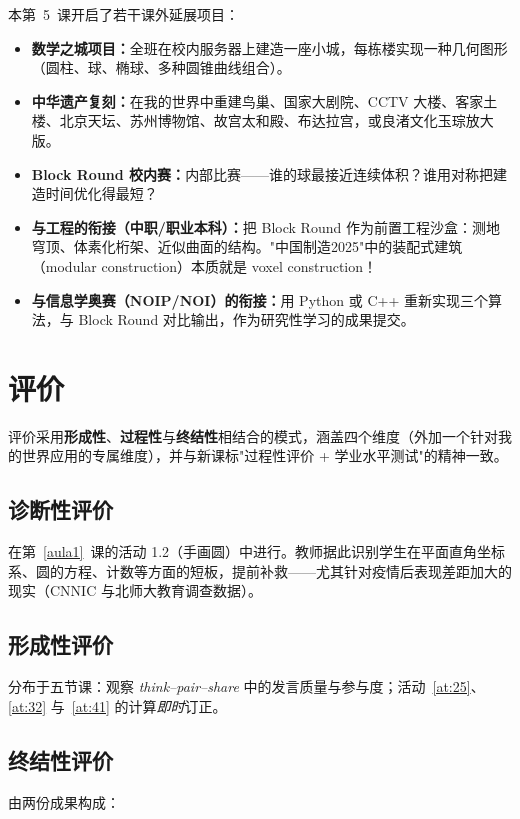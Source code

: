 \documentclass[12pt,a4paper]{scrartcl}
\newcommand{\acc}[1]{\textcolor{accent}{\textbf{#1}}}
\begin{document}
\begin{minecraft}[拓展可能性]
本第~5~课开启了若干课外延展项目：
\begin{itemize}[leftmargin=1.3em,itemsep=0.15em,topsep=0.3em,nosep]
  \item \textbf{数学之城项目：}全班在校内服务器上建造一座小城，每栋楼实现一种几何图形（圆柱、球、椭球、多种圆锥曲线组合）。
  \item \textbf{中华遗产复刻：}在我的世界中重建鸟巢、国家大剧院、CCTV 大楼、客家土楼、北京天坛、苏州博物馆、故宫太和殿、布达拉宫，或良渚文化玉琮放大版。
  \item \textbf{Block Round 校内赛：}内部比赛——谁的球最接近连续体积？谁用对称把建造时间优化得最短？
  \item \textbf{与工程的衔接（中职/职业本科）：}把 Block Round 作为前置工程沙盒：测地穹顶、体素化桁架、近似曲面的结构。"中国制造2025"中的装配式建筑（modular construction）本质就是 voxel construction！
  \item \textbf{与信息学奥赛（NOIP/NOI）的衔接：}用 Python 或 C++ 重新实现三个算法，与 Block Round 对比输出，作为研究性学习的成果提交。
\end{itemize}
\end{minecraft}

\section{评价}\label{sec:avaliacao}

评价采用\acc{形成性}、\acc{过程性}与\acc{终结性}相结合的模式，涵盖四个维度（外加一个针对我的世界应用的专属维度），并与新课标"过程性评价 + 学业水平测试"的精神一致。

\subsection{诊断性评价}
在第~\ref{aula1}~课的活动 1.2（手画圆）中进行。教师据此识别学生在平面直角坐标系、圆的方程、计数等方面的短板，提前补救——尤其针对疫情后表现差距加大的现实（CNNIC 与北师大教育调查数据）。

\subsection{形成性评价}
分布于五节课：观察 \emph{think--pair--share} 中的发言质量与参与度；活动~\ref{at:25}、\ref{at:32} 与~\ref{at:41} 的计算\emph{即时}订正。

\subsection{终结性评价}
由两份成果构成：
\end{document}
